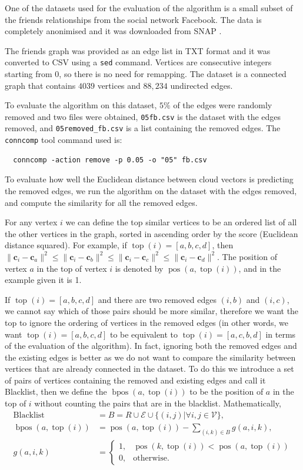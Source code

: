 \documentclass[12pt]{report}
\DeclareMathOperator{\ttop}{top}
\DeclareMathOperator{\bpos}{bpos}
\DeclareMathOperator{\pos}{pos}
\begin{document}
One of the datasets used for the evaluation of the algorithm is a small subset
of the friends relationships from the social network Facebook. The  data is
completely anonimised and it was downloaded from SNAP \cite{snapnets}.

The friends graph was provided as an edge list in TXT format and it was converted
to CSV using a {\tt sed} command. Vertices are consecutive integers starting
from 0, so there is no need for remapping. The dataset is a connected graph that
contains $4039$ vertices and $88,234$ undirected edges.

To evaluate the algorithm on this dataset, $5\%$ of the edges were randomly
removed and two files were obtained, {\tt 05fb.csv} is the dataset with the
edges removed, and {\tt 05removed\_fb.csv} is a list containing the removed
edges. The {\tt conncomp} tool command used is:
\begin{lstlisting}
  conncomp -action remove -p 0.05 -o "05" fb.csv
\end{lstlisting}


To evaluate how well the Euclidean distance between cloud vectors is predicting
the removed edges, we run the algorithm on the dataset with the edges removed,
and compute the similarity for all the removed edges.


For any vertex $i$ we can define the top similar vertices to be an ordered list
of all the other vertices in the graph, sorted in ascending order by the score
(Euclidean distance squared). For example, if $\ttop(i) = [a, b, c, d]$, then
$\|\bm{c}_i - \bm{c}_a\|^2 \leq \|\bm{c}_i - \bm{c}_b\|^2 \leq
\|\bm{c}_i - \bm{c}_c\|^2 \leq \|\bm{c}_i - \bm{c}_d\|^2$. The position of
vertex $a$ in the top of vertex $i$ is denoted by $\pos(a,\ttop(i))$, and in the
example given it is 1.


If $\ttop(i) = [a, b, c, d]$ and there are two removed edges $(i, b)$ and $(i, c)$,
we cannot say which of those pairs should be more similar, therefore we want
the top to ignore the ordering of vertices in the removed edges (in other words,
we want $\ttop(i) = [a, b, c, d]$ to be equivalent to $\ttop(i) = [a, c, b, d]$ in
terms of the evaluation of the algorithm). In fact, ignoring both the removed
edges and the existing edges is better as we do not want to compare the
similarity between vertices that are already connected in the dataset. To do
this we introduce a set of pairs of vertices containing the removed and existing
edges and call it Blacklist, then we define the $\bpos(a, \ttop(i))$ to be the
position of $a$ in the top of $i$ without counting the pairs that are in the
blacklist. Mathematically,
\begin{align}
  \text{Blacklist} &= B = R \cup \mathcal{E} \cup \{(i,j) | \forall i, j \in
    \mathcal{V}\}, \\
  \bpos(a, \ttop(i)) &= \pos(a, \ttop(i)) - \sum_{(i, k) \in B} g(a,i,k), \\
  g(a,i,k) &= \left\{ \begin{array}{ll}
    1, & \pos(k, \ttop(i)) < \pos(a, \ttop(i)) \\
    0, & \text{otherwise}.
  \end{array} \right.
\end{align}
\end{document}
